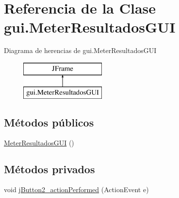 \hypertarget{classgui_1_1MeterResultadosGUI}{}\section{Referencia de la Clase gui.\+Meter\+Resultados\+G\+UI}
\label{classgui_1_1MeterResultadosGUI}
Diagrama de herencias de gui.\+Meter\+Resultados\+G\+UI\begin{figure}[H]
\begin{center}
\leavevmode
\includegraphics[height=2.000000cm]{classgui_1_1MeterResultadosGUI}
\end{center}
\end{figure}
\subsection*{Métodos públicos}
\begin{DoxyCompactItemize}
\item 
\mbox{\hyperlink{classgui_1_1MeterResultadosGUI_a9499e52fa7b3e85edb2ace269393b2c4}{Meter\+Resultados\+G\+UI}} ()
\end{DoxyCompactItemize}
\subsection*{Métodos privados}
\begin{DoxyCompactItemize}
\item 
void \mbox{\hyperlink{classgui_1_1MeterResultadosGUI_ae1dc5f8c26ed59e1e6e28353f9e6c339}{j\+Button2\+\_\+action\+Performed}} (Action\+Event e)
\end{DoxyCompactItemize}
